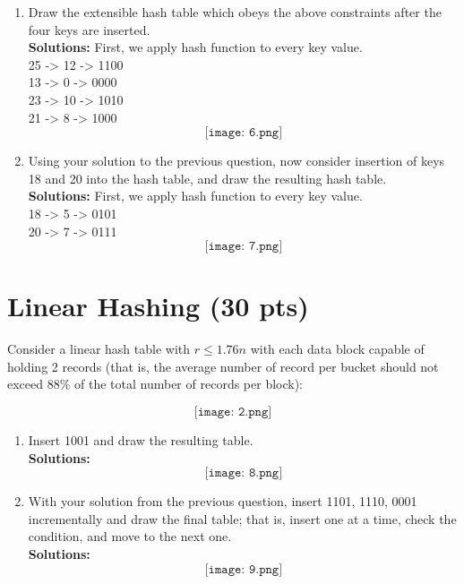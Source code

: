 \documentclass[paper=a4, fontsize=11pt]{scrartcl}
\numberwithin{equation}{section}		%
\numberwithin{figure}{section}			%
\numberwithin{table}{section}				%
\begin{document}
	\begin{enumerate}
		\item Draw the extensible hash table which obeys the above constraints after the four keys are inserted.\\
		\textbf{Solutions: }
		First, we apply hash function to every key value.\\
		25 -> 12 -> 1100 \\
		13 -> 0 -> 0000 \\
		23 -> 10 -> 1010 \\
		21 -> 8 -> 1000 \\
		\[
		\texttt{[image: 6.png]}
		\]
		
		
		\item Using your solution to the previous question, now consider insertion of keys 18 and 20 into the hash table, and draw the resulting hash table.\\
		\textbf{Solutions: }
		First, we apply hash function to every key value.\\
		18 -> 5 -> 0101 \\
		20 -> 7 -> 0111 \\
		\[
		\texttt{[image: 7.png]}
		\]
		
	\end{enumerate}
	
	
	
	\section{Linear Hashing (30 pts)}
	
	Consider a linear hash table with $r \leq 1.76n$ with each data block capable of holding 2 records (that is, the average number of record per bucket should not exceed $88\%$ of the total number of records per block):
	
	\[
	\texttt{[image: 2.png]}
	\]
	
	\begin{enumerate}
		\item Insert 1001 and draw the resulting table.\\
		\textbf{Solutions: }
		\[
		\texttt{[image: 8.png]}
		\]
		
		\item With your solution from the previous question, insert 1101, 1110, 0001 incrementally and draw the final table; that is, insert one at a time, check the condition, and move to the next one.\\
		\textbf{Solutions: }
		\[
		\texttt{[image: 9.png]}
		\]
		
	\end{enumerate}
	
	
	
	
	
\end{document}
